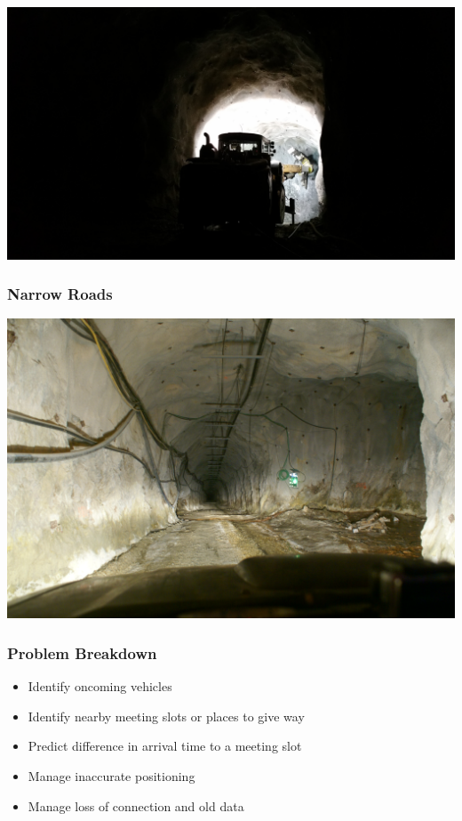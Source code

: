 \documentclass{beamer}
\begin{document}
	{
	\begin{frame}
		\includegraphics[width=\textwidth,height=\textheight,keepaspectratio]{diggingTunnel.jpg}
	\end{frame}
	}
	\begin{frame}
		\frametitle{Narrow Roads}
		\includegraphics[width=\textwidth,height=\textheight,keepaspectratio]{mineRoad.jpg}
	\end{frame}

	\begin{frame}
		\frametitle{Problem Breakdown}
		\begin{itemize}
			\item Identify oncoming vehicles
			\item Identify nearby meeting slots or places to give way
			\item Predict difference in arrival time to a meeting slot
			\item Manage inaccurate positioning
			\item Manage loss of connection and old data
		\end{itemize}
	\end{frame}
\end{document}
